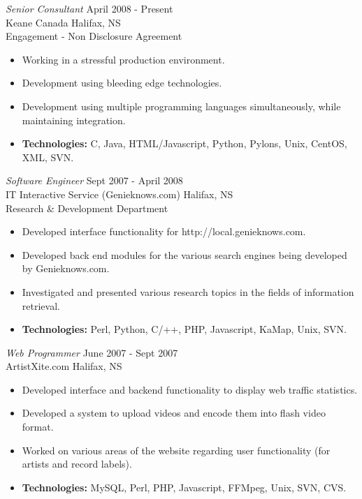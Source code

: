 \documentclass[line,margin]{res}
\begin{document}
\begin{resume}
   {\sl Senior Consultant} \hfill April 2008 - Present \\
    Keane Canada \hfill Halifax, NS \\
    Engagement - Non Disclosure Agreement \smallskip
    \begin{itemize}  \itemsep -2pt %
     \item Working in a stressful production environment.
     \item Development using bleeding edge technologies.
     \item Development using multiple programming languages
            simultaneously, while maintaining integration.
     \item {\bf Technologies:} \hspace{1pt} 
        C, Java, HTML/Javascript, Python, Pylons, Unix, CentOS, \newline 
        \hspace*{72pt} XML, SVN.
    \end{itemize}

   {\sl Software Engineer} \hfill Sept 2007 - April 2008 \\
    IT Interactive Service (Genieknows.com) \hfill Halifax, NS \\
    Research {\&} Development Department \smallskip
    \begin{itemize}  \itemsep -2pt %
     \item Developed interface functionality for
             http://local.genieknows.com.
     \item Developed back end modules for the various search
             engines being developed by Genieknows.com.
     \item Investigated and presented various research topics
             in the fields of information retrieval.
     \item {\bf Technologies:} \hspace{1pt} 
        Perl, Python, C/++, PHP, Javascript, KaMap, Unix, SVN.
    \end{itemize}

   {\sl Web Programmer} \hfill June 2007 - Sept 2007 \\
    ArtistXite.com \hfill Halifax, NS \smallskip
    \begin{itemize}  \itemsep -2pt %
     \item Developed interface and backend functionality to display 
               web traffic statistics.
     \item Developed a system to upload videos and encode them
                into flash video format.
     \item Worked on various areas of the website regarding user 
               functionality (for artists and record labels).
     \item {\bf Technologies:}\hspace{4pt} 
        MySQL, Perl, PHP, Javascript, FFMpeg, Unix, SVN, CVS.
    \end{itemize}


\end{resume}
\end{document}
